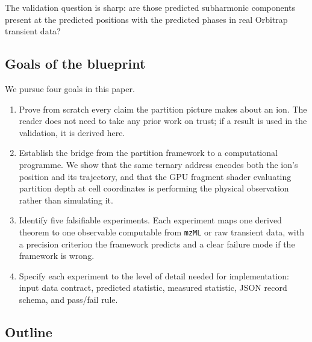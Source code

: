 \documentclass[twocolumn,10pt,a4paper]{article}
\theoremstyle{thmstyle}
\theoremstyle{definition}
\theoremstyle{remark}
\begin{document}
The validation question is sharp: are those predicted subharmonic
components present at the predicted positions with the predicted
phases in real Orbitrap transient data?

\subsection{Goals of the blueprint}

We pursue four goals in this paper.
\begin{enumerate}[leftmargin=*,itemsep=0.2em]
\item Prove from scratch every claim the partition picture makes
about an ion. The reader does not need to take any prior work on
trust; if a result is used in the validation, it is derived here.
\item Establish the bridge from the partition framework to a
computational programme. We show that the same ternary address
encodes both the ion's position and its trajectory, and that the GPU
fragment shader evaluating partition depth at cell coordinates is
performing the physical observation rather than simulating it.
\item Identify five falsifiable experiments. Each experiment maps one
derived theorem to one observable computable from \texttt{mzML} or raw
transient data, with a precision criterion the framework predicts and
a clear failure mode if the framework is wrong.
\item Specify each experiment to the level of detail needed for
implementation: input data contract, predicted statistic, measured
statistic, JSON record schema, and pass/fail rule.
\end{enumerate}

\subsection{Outline}
\end{document}
